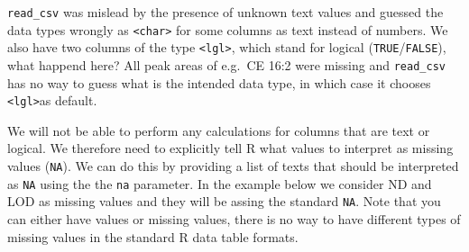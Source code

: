 \documentclass[
  letterpaper,
  DIV=11,
  numbers=noendperiod]{scrreprt}
\begin{document}
\texttt{read\_csv} was mislead by the presence of unknown text values
and guessed the data types wrongly as
\texttt{\textless{}char\textgreater{}} for some columns as text instead
of numbers. We also have two columns of the type
\texttt{\textless{}lgl\textgreater{}}, which stand for logical
(\texttt{TRUE}/\texttt{FALSE}), what happend here? All peak areas of
e.g.~CE 16:2 were missing and \texttt{read\_csv} has no way to guess
what is the intended data type, in which case it chooses
\texttt{\textless{}lgl\textgreater{}}as default.

We will not be able to perform any calculations for columns that are
text or logical. We therefore need to explicitly tell R what values to
interpret as missing values (\texttt{NA}). We can do this by providing a
list of texts that should be interpreted as \texttt{NA} using the the
\texttt{na} parameter. In the example below we consider ND and LOD as
missing values and they will be assing the standard \texttt{NA}. Note
that you can either have values or missing values, there is no way to
have different types of missing values in the standard R data table
formats.
\end{document}
